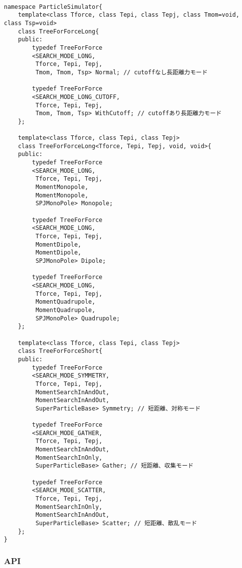\begin{lstlisting}

namespace ParticleSimulator{
    template<class Tforce, class Tepi, class Tepj, class Tmom=void, class Tsp=void>
    class TreeForForceLong{
    public:
        typedef TreeForForce
        <SEARCH_MODE_LONG,
         Tforce, Tepi, Tepj,
         Tmom, Tmom, Tsp> Normal; // cutoffなし長距離力モード

        typedef TreeForForce
        <SEARCH_MODE_LONG_CUTOFF,
         Tforce, Tepi, Tepj,
         Tmom, Tmom, Tsp> WithCutoff; // cutoffあり長距離力モード
    };

    template<class Tforce, class Tepi, class Tepj>
    class TreeForForceLong<Tforce, Tepi, Tepj, void, void>{
    public:
        typedef TreeForForce
        <SEARCH_MODE_LONG,
         Tforce, Tepi, Tepj,
         MomentMonopole,
         MomentMonopole,
         SPJMonoPole> Monopole;

        typedef TreeForForce
        <SEARCH_MODE_LONG,
         Tforce, Tepi, Tepj,
         MomentDipole,
         MomentDipole,
         SPJMonoPole> Dipole;

        typedef TreeForForce
        <SEARCH_MODE_LONG,
         Tforce, Tepi, Tepj,
         MomentQuadrupole,
         MomentQuadrupole,
         SPJMonoPole> Quadrupole;
    };

    template<class Tforce, class Tepi, class Tepj>
    class TreeForForceShort{
    public:
        typedef TreeForForce 
        <SEARCH_MODE_SYMMETRY,
         Tforce, Tepi, Tepj,
         MomentSearchInAndOut,
         MomentSearchInAndOut,
         SuperParticleBase> Symmetry; // 短距離、対称モード

        typedef TreeForForce 
        <SEARCH_MODE_GATHER,
         Tforce, Tepi, Tepj,
         MomentSearchInAndOut,
         MomentSearchInOnly,
         SuperParticleBase> Gather; // 短距離、収集モード

        typedef TreeForForce
        <SEARCH_MODE_SCATTER,
         Tforce, Tepi, Tepj,
         MomentSearchInOnly,
         MomentSearchInAndOut,
         SuperParticleBase> Scatter; // 短距離、散乱モード
    };
}
\end{lstlisting}

\subsubsection{API}


